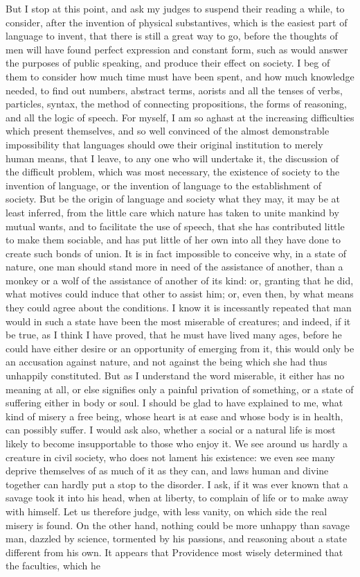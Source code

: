 \documentclass[12pt]{report}
\begin{document}
But I stop at this point, and ask my judges to suspend their reading a while, to consider, after the invention of physical substantives, which is the easiest part of language to invent, that there is still a great way to go, before the thoughts of men will have found perfect expression and constant form, such as would answer the purposes of public speaking, and produce their effect on society. I beg of them to consider how much time must have been spent, and how much knowledge needed, to find out numbers, abstract terms, aorists and all the tenses of verbs, particles, syntax, the method of connecting propositions, the forms of reasoning, and all the logic of speech. For myself, I am so aghast at the increasing difficulties which present themselves, and so well convinced of the almost demonstrable impossibility that languages should owe their original institution to merely human means, that I leave, to any one who will undertake it, the discussion of the difficult problem, which was most necessary, the existence of society to the invention of language, or the invention of language to the establishment of society. But be the origin of language and society what they may, it may be at least inferred, from the little care which nature has taken to unite mankind by mutual wants, and to facilitate the use of speech, that she has contributed little to make them sociable, and has put little of her own into all they have done to create such bonds of union. It is in fact impossible to conceive why, in a state of nature, one man should stand more in need of the assistance of another, than a monkey or a wolf of the assistance of another of its kind: or, granting that he did, what motives could induce that other to assist him; or, even then, by what means they could agree about the conditions. I know it is incessantly repeated that man would in such a state have been the most miserable of creatures; and indeed, if it be true, as I think I have proved, that he must have lived many ages, before he could have either desire or an opportunity of emerging from it, this would only be an accusation against nature, and not against the being which she had thus unhappily constituted. But as I understand the word miserable, it either has no meaning at all, or else signifies only a painful privation of something, or a state of suffering either in body or soul. I should be glad to have explained to me, what kind of misery a free being, whose heart is at ease and whose body is in health, can possibly suffer. I would ask also, whether a social or a natural life is most likely to become insupportable to those who enjoy it. We see around us hardly a creature in civil society, who does not lament his existence: we even see many deprive themselves of as much of it as they can, and laws human and divine together can hardly put a stop to the disorder. I ask, if it was ever known that a savage took it into his head, when at liberty, to complain of life or to make away with himself. Let us therefore judge, with less vanity, on which side the real misery is found. On the other hand, nothing could be more unhappy than savage man, dazzled by science, tormented by his passions, and reasoning about a state different from his own. It appears that Providence most wisely determined that the faculties, which he 
\end{document}
